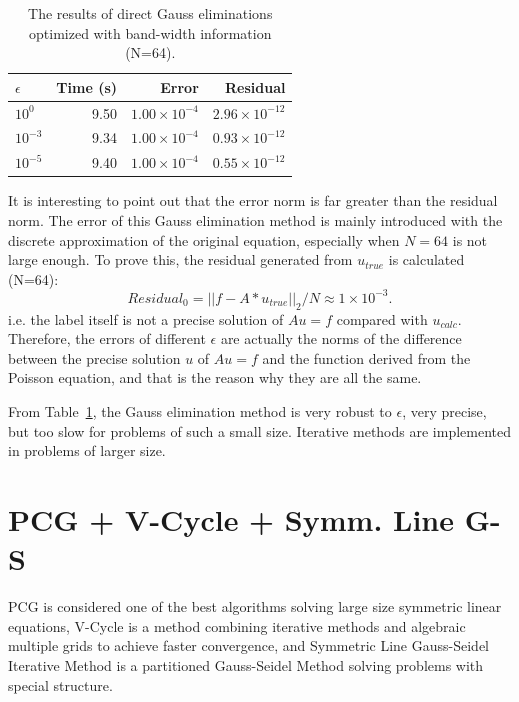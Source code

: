 \documentclass{article}
\begin{document}
\begin{table}[t]
\caption{The results of direct Gauss eliminations optimized with band-width information (N=64).}
\label{tab1}
\vskip 0.15in
\begin{center}
\begin{small}
\begin{sc}
\begin{tabular}{lrrr}
\toprule
$\epsilon$ & Time (s) & Error & Residual  \\
\midrule
$10^0$ & 9.50 & $1.00 \times 10^{-4}$ & $2.96 \times 10^{-12}$ \\
$10^{-3}$ & 9.34 & $1.00 \times 10^{-4}$ & $0.93 \times 10^{-12}$ \\
$10^{-5}$ & 9.40 & $1.00 \times 10^{-4}$ & $0.55 \times 10^{-12}$ \\
\bottomrule
\end{tabular}
\end{sc}
\end{small}
\end{center}
\vskip -0.1in
\end{table}

It is interesting to point out that the error norm is far greater than the residual norm. The error of this Gauss elimination method is mainly introduced with the discrete approximation of the original equation, especially when $N=64$ is not large enough. To prove this, the residual generated from $u_{true}$ is calculated (N=64):
\begin{displaymath}
  Residual_0=||f-A*u_{true}||_2/N \approx 1\times 10^{-3}.
\end{displaymath}
i.e. the label itself is not a precise solution of $Au=f$ compared with $u_{calc}$. Therefore, the errors of different $\epsilon$ are actually the norms of the difference between the precise solution $u$ of $Au=f$ and the function derived from the Poisson equation, and that is the reason why they are all the same.

From Table~\ref{tab1}, the Gauss elimination method is very robust to $\epsilon$, very precise, but too slow for problems of such a small size. Iterative methods are implemented in problems of larger size.

\section{PCG + V-Cycle + Symm. Line G-S}

PCG is considered one of the best algorithms solving large size symmetric linear equations, V-Cycle is a method combining iterative methods and algebraic multiple grids to achieve faster convergence, and Symmetric Line Gauss-Seidel Iterative Method is a partitioned Gauss-Seidel Method solving problems with special structure.
\end{document}
